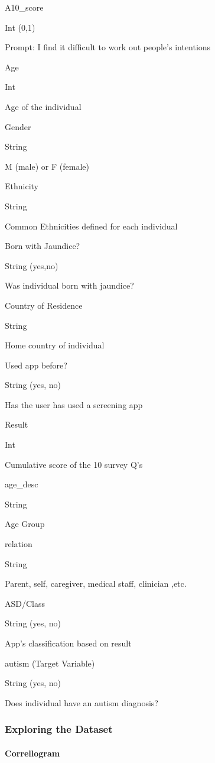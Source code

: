 \documentclass[]{article}
\let\oldparagraph\paragraph
\renewcommand{\paragraph}[1]{\oldparagraph{#1}\mbox{}}
\begin{document}
A10\_score

Int (0,1)

Prompt: I find it difficult to work out people's intentions

Age

Int

Age of the individual

Gender

String

M (male) or F (female)

Ethnicity

String

Common Ethnicities defined for each individual

Born with Jaundice?

String (yes,no)

Was individual born with jaundice?

Country of Residence

String

Home country of individual

Used app before?

String (yes, no)

Has the user has used a screening app

Result

Int

Cumulative score of the 10 survey Q's

age\_desc

String

Age Group

relation

String

Parent, self, caregiver, medical staff, clinician ,etc.

ASD/Class

String (yes, no)

App's classification based on result

autism (Target Variable)

String (yes, no)

Does individual have an autism diagnosis?

\hypertarget{exploring-the-dataset}{%
\subsubsection{Exploring the Dataset}\label{exploring-the-dataset}}

\hypertarget{correllogram}{%
\paragraph{Correllogram}\label{correllogram}}
\end{document}
